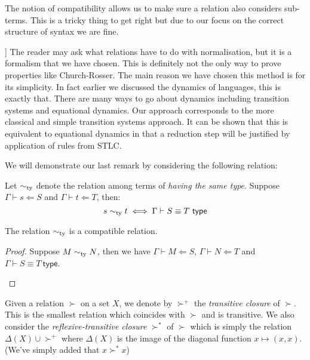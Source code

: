 \begin{remark}
    The notion of compatibility allows us to make sure a relation also considers sub-terms. This is a tricky thing to get right but due to our focus on the correct structure of syntax we are fine.
\end{remark}

\begin{remark}
[[CLEAN THIS UP]]
    The reader may ask what relations have to do with normalisation, but it is a formalism that we have chosen. This is definitely not the only way to prove properties like Church-Rosser. The main reason we have chosen this method is for its simplicity. In fact earlier we discussed the dynamics of languages, this is exactly that. There are many ways to go about dynamics including transition systems and equational dynamics. Our approach corresponds to the more classical and simple transition systems approach. It can be shown that this is equivalent to equational dynamics in that a reduction step will be justified by application of rules from STLC.
\end{remark}

We will demonstrate our last remark by considering the following relation:

\begin{defin}
    Let $\sim_{\mathrm{ty}}$ denote the relation among terms of \emph{having the same type}. Suppose $\Gamma \vdash s \Leftarrow S$ and $\Gamma \vdash t \Leftarrow T$, then:
    $$
        s \sim_{\mathrm{ty}} t \iff \Gamma \vdash S \equiv T \ \mathsf{type}
    $$
\end{defin}

\begin{lemma}
    The relation $\sim_{\mathrm{ty}}$ is a compatible relation.
\end{lemma}

\begin{proof}
    Suppose $M \sim_{\mathrm{ty}} N$, then we have $\Gamma \vdash M \Leftarrow S$, $\Gamma \vdash N \Leftarrow T$ and $\Gamma \vdash S \equiv T \ \mathsf{type}$.
    \begin{enumerate}
        
    \end{enumerate}
\end{proof}

\begin{defin}
    Given a relation $\succ$ on a set $X$, we denote by $\succ^+$ the \emph{transitive closure} of $\succ$. This is the smallest relation which coincides with $\succ$ and is transitive. We also consider the \emph{reflexive-transitive closure} $\succ^*$ of $\succ$ which is simply the relation $\Delta(X)\cup \succ^+ $ where $\Delta(X)$ is the image of the diagonal function $x \mapsto (x,x)$. (We've simply added that $x \succ^* x$)
\end{defin}

